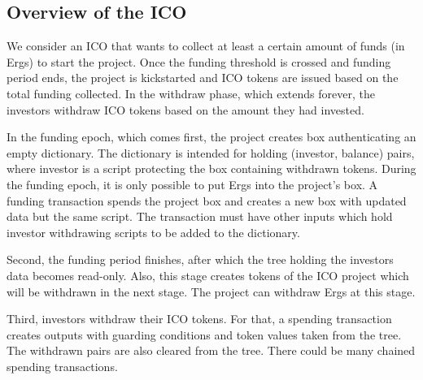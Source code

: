 \documentclass[11pt]{article}
\begin{document}
\subsection{Overview of the ICO}
We consider an ICO that wants to collect at least a certain amount of funds (in Ergs) to start the project. Once the funding threshold is crossed and funding period ends, the project is kickstarted and ICO tokens are issued based on the total funding collected. In the withdraw phase, which extends forever, the investors withdraw ICO tokens based on the amount they had invested. %

In the funding epoch, which comes first, the project creates box authenticating an empty dictionary. The dictionary is intended for holding (investor, balance) pairs, where investor is a script protecting the box containing withdrawn tokens. %
During the funding epoch, it is only possible to put Ergs into the project's box. A funding transaction spends the project box and creates a new box with updated data but the same script. The transaction must have other inputs which hold investor withdrawing scripts to be added to the dictionary. %

Second, the funding period finishes, after which the tree holding the investors data becomes read-only. 
Also, this stage creates tokens of the ICO project which will be withdrawn in the next stage. The project can withdraw Ergs at this stage.

Third, investors withdraw their ICO tokens. For that, a spending transaction creates outputs with guarding conditions and token values taken from the tree. The withdrawn pairs are also cleared from the tree. There could be many chained spending transactions.
\end{document}
